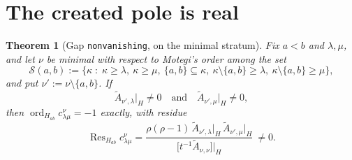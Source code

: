 \documentclass[11pt]{article}
\theoremstyle{plain}
\newtheorem{thm}{Theorem}
\theoremstyle{definition}
\theoremstyle{remark}
\theoremstyle{plain}
\newcommand{\At}{\widetilde{A}}
\newcommand{\ord}{\operatorname{ord}}
\newcommand{\Res}{\operatorname{Res}}
\begin{document}
\section{The created pole is real}
\label{sec:created}

\begin{thm}[Gap \texttt{nonvanishing}, on the minimal stratum]\label{thm:created}
Fix $a<b$ and $\lambda,\mu$, and let $\nu$ be \emph{minimal} with respect to
Motegi's order among the set
\[
\mathcal{S}(a,b):=\bigl\{\kappa\;:\;\kappa\ge\lambda,\ \kappa\ge\mu,\
\{a,b\}\subseteq\kappa,\ \kappa\setminus\{a,b\}\ge\lambda,\
\kappa\setminus\{a,b\}\ge\mu\bigr\},
\]
and put $\nu':=\nu\setminus\{a,b\}$.  If
\begin{equation}
\At_{\nu',\lambda}\big|_H\ne0
\quad\text{and}\quad
\At_{\nu',\mu}\big|_H\ne0,
\label{eq:hyp}
\end{equation}
then $\ord_{H_{ab}}c^{\nu}_{\lambda\mu}=-1$ exactly, with residue
\begin{equation}
\Res_{H_{ab}}c^{\nu}_{\lambda\mu}
=\frac{\rho(\rho-1)\,\At_{\nu',\lambda}\big|_H\,\At_{\nu',\mu}\big|_H}
{\bigl[t^{-1}\At_{\nu,\nu}\bigr]\big|_H}\ \ne0 .
\label{eq:res}
\end{equation}
\end{thm}
\end{document}
